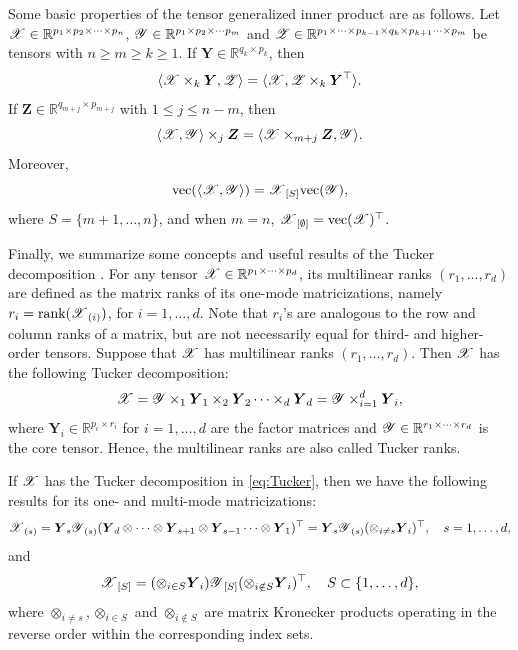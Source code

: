 \documentclass[12pt]{article}
\newcommand{\bm}{\boldsymbol}
\newcommand{\cm}[1]{\mbox{\boldmath$\mathscr{#1}$}}
\begin{document}
Some basic properties of the tensor generalized inner product are as follows. Let $\cm{X}\in\mathbb{R}^{p_1\times p_2\times\cdots\times p_n}$, $\cm{Y}\in\mathbb{R}^{p_1\times p_2\times\cdots p_m}$ and $\cm{Z}\in\mathbb{R}^{p_1\times\cdots \times p_{k-1}\times q_k\times p_{k+1}\cdots \times p_m}$ be tensors with $n\geq m\geq k\geq1$. If $\bm{Y}\in\mathbb{R}^{q_k\times p_k}$, then
\begin{equation}\label{eq:inner_ex}
\langle\cm{X}\times_k\bm{Y},\cm{Z}\rangle=\langle\cm{X},\cm{Z}\times_k\bm{Y}^\top\rangle.
\end{equation}
If  $\bm{Z}\in\mathbb{R}^{q_{m+j}\times p_{m+j}}$  with $1\leq j\leq n-m$, then
\begin{equation}\label{eq:inner_out}
\langle\cm{X},\cm{Y}\rangle\times_j\bm{Z}=\langle\cm{X}\times_{m+j}\bm{Z},\cm{Y}\rangle.
\end{equation}
Moreover, 
\begin{equation}\label{eq:vecinner}
\text{vec}(\langle\cm{X},\cm{Y}\rangle)=\cm{X}_{[S]}\text{vec}(\cm{Y}),
\end{equation}
where $S=\{m+1,\dots, n\}$, and when $m=n$, $\cm{X}_{[\emptyset]}=\text{vec}(\cm{X})^\top$.


Finally, we summarize some concepts and useful results of the Tucker decomposition \citep{tucker1966some,deLathauwer2000multilinear}. For any tensor $\cm{X}\in\mathbb{R}^{p_1\times\cdots\times p_d}$, its multilinear ranks $(r_1,\dots,r_d)$ are defined as the matrix ranks of its one-mode matricizations, namely $r_i=\text{rank}(\cm{X}_{(i)})$, for $i=1,\dots,d$. Note that $r_i$'s are analogous to the row and column ranks of a matrix, but are not necessarily equal for third- and higher-order tensors.  Suppose that $\cm{X}$ has multilinear ranks $(r_1,\dots,r_d)$. Then $\cm{X}$ has the following  Tucker decomposition:
\begin{equation}\label{eq:Tucker}
\cm{X}=\cm{Y}\times_1\bm{Y}_1\times_2\bm{Y}_2\cdots\times_d\bm{Y}_d=\cm{Y}\times_{i=1}^d\bm{Y}_i,
\end{equation}
where $\bm{Y}_i\in\mathbb{R}^{p_i\times r_i}$ for $i=1, \dots, d$ are the factor matrices  and $\cm{Y}\in\mathbb{R}^{r_1\times\cdots\times r_d}$  is the core tensor. Hence, the multilinear ranks are  also called Tucker ranks. 

If  $\cm{X}$ has the Tucker decomposition in \eqref{eq:Tucker}, then we have the following results for its one- and multi-mode matricizations:
\begin{equation}
\cm{X}_{(s)}=\bm{Y}_s\cm{Y}_{(s)}(\bm{Y}_d\otimes\cdots\otimes\bm{Y}_{s+1}\otimes\bm{Y}_{s-1}\cdots\otimes\bm{Y}_1)^\top=\bm{Y}_s\cm{Y}_{(s)}(\otimes_{i\neq s}\bm{Y}_i)^\top, \quad s=1,\dots, d,
\end{equation}
and 
\begin{equation}\label{eq:mmmat}
\cm{X}_{[S]}=(\otimes_{i\in S}\bm{Y}_i)\cm{Y}_{[S]}(\otimes_{i\notin S}\bm{Y}_i)^\top, \quad S\subset\{1,\dots,d\},
\end{equation}
where $\otimes_{i\neq s}, \otimes_{i\in S}$ and $\otimes_{i\notin S}$ are matrix Kronecker products operating in the reverse order within the corresponding index sets.
\end{document}
